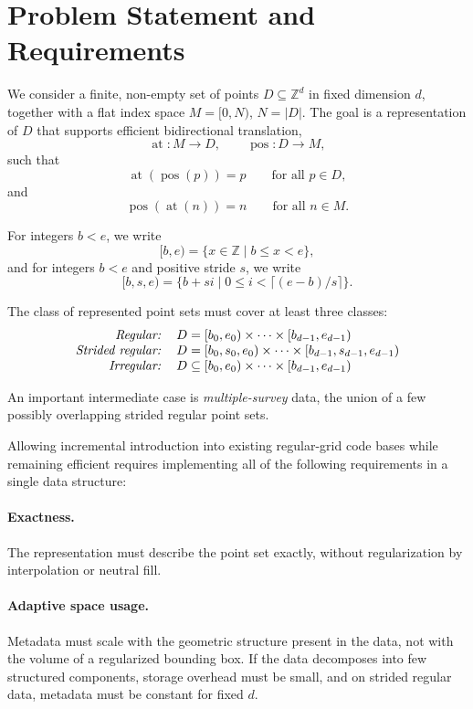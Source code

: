 \documentclass[manuscript,screen,review]{acmart}
\theoremstyle{definition}
\theoremstyle{plain}
\begin{document}
\section{Problem Statement and Requirements}
\label{section:requirements}

We consider a finite, non-empty set of points $D \subseteq \mathbb{Z}^d$
in fixed dimension $d$, together with a flat index space
$M = [0,N)$, $N = |D|$.
The goal is a representation of $D$ that supports efficient bidirectional translation,
\[
  \operatorname{at} : M \to D,
  \qquad
  \operatorname{pos} : D \to M,
\]
such that
\[
  \operatorname{at}(\operatorname{pos}(p)) = p
  \qquad\text{for all } p \in D,
\]
and
\[
  \operatorname{pos}(\operatorname{at}(n)) = n
  \qquad\text{for all } n \in M.
\]

For integers $b < e$, we write
\[
  [b,e) = \{x \in \mathbb{Z} \mid b \le x < e\},
\]
and for integers $b < e$ and positive stride $s$, we write
\[
  [b,s,e) = \{ b + s i \mid 0 \le i < \lceil (e-b)/s \rceil \}.
\]

The class of represented point sets must cover at least three classes:
\[
\begin{tabular}{rl}
\emph{Regular:} & $D = [b_0, e_0) \times \cdots \times [b_{d-1}, e_{d-1})$
\\
\emph{Strided regular:} & $D = [b_0, s_0, e_0) \times \cdots \times [b_{d-1}, s_{d-1}, e_{d-1})$
\\
\emph{Irregular:} & $D \subseteq [b_0, e_0) \times \cdots \times [b_{d-1}, e_{d-1})$
\end{tabular}
\]

An important intermediate case is \emph{multiple-survey} data, the
union of a few possibly overlapping strided regular point sets.

Allowing incremental introduction into existing regular-grid code
bases while remaining efficient requires implementing all of the
following requirements in a single data structure:

\paragraph{Exactness.}
The representation must describe the point set exactly, without regularization by interpolation or neutral fill.

\paragraph{Adaptive space usage.}
Metadata must scale with the geometric structure present in the data,
not with the volume of a regularized bounding box. If the data
decomposes into few structured components, storage overhead must be
small, and on strided regular data, metadata must be constant for fixed $d$.
\end{document}
